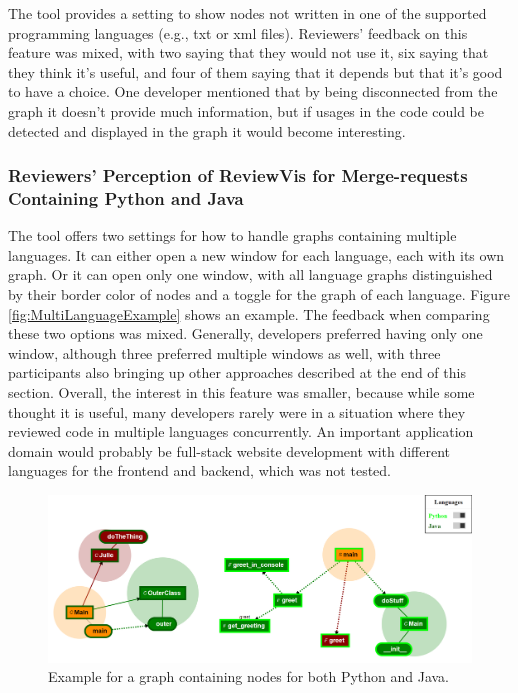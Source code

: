 \documentclass[a4paper,11pt,twoside]{article}
\theoremstyle{definition} %
\begin{document}
The tool provides a setting to show nodes not written in one of the supported programming languages (e.g., txt or xml files). Reviewers' feedback on this feature was mixed, with two saying that they would not use it, six saying that they think it’s useful, and four of them saying that it depends but that it’s good to have a choice. One developer mentioned that by being disconnected from the graph it doesn’t provide much information, but if usages in the code could be detected and displayed in the graph it would become interesting. 


\subsubsection{Reviewers' Perception of ReviewVis for Merge-requests Containing Python and Java} \label{SubSubSec:RQ1.2}

The tool offers two settings for how to handle graphs containing multiple languages. It can either open a new window for each language, each with its own graph. Or it can open only one window, with all language graphs distinguished by their border color of nodes and a toggle for the graph of each language. Figure \ref{fig:MultiLanguageExample} shows an example.
The feedback when comparing these two options was mixed. Generally, developers preferred having only one window, although three preferred multiple windows as well, with three participants also bringing up other approaches described at the end of this section. Overall, the interest in this feature was smaller, because while some thought it is useful, many developers rarely were in a situation where they reviewed code in multiple languages concurrently. An important application domain would probably be full-stack website development with different languages for the frontend and backend, which was not tested.

\begin{figure}[h]
    \centering
    \includegraphics[width=1.0\textwidth]{Subfigures/multi_language_graph_example.png}
    \caption{Example for a graph containing nodes for both Python and Java.}
    \label{fig:MultiLanguageExample2}
\end{figure}
\end{document}

